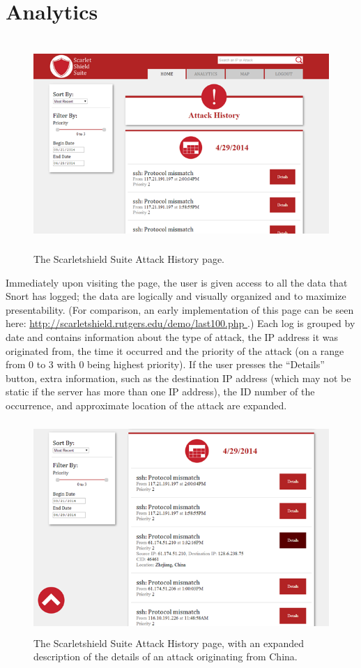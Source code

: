 \documentclass[11.5pt,letterpaper,titlepage]{report}
\begin{document}
\section{Analytics}

\begin{figure}[h!]
\centering
  \includegraphics[height=8cm]{./history.png}
  \caption{The Scarletshield Suite Attack History page.}
\end{figure}

Immediately upon visiting the page, the user is given access to all the data
that Snort has logged; the data are logically and visually organized and to
maximize presentability. (For comparison, an early implementation of this
page can be seen here: \url{http://scarletshield.rutgers.edu/demo/last100.php }.) 
Each log is grouped by date and contains information
about the type of attack, the IP address it was originated from, the time it
occurred and the priority of the attack (on a range from 0 to 3 with 0 being
highest priority). If the user presses the ``Details'' button, extra information,
such as the destination IP address (which may not be static if the server has
more than one IP address), the ID number of the occurrence, and approximate
location of the attack are expanded.


\begin{figure}[h!]
\centering
  \includegraphics[height=8cm]{./historydet.png}
  \caption{The Scarletshield Suite Attack History page, with an expanded
  description of the details of an attack originating from China.}
\end{figure}
\end{document}
